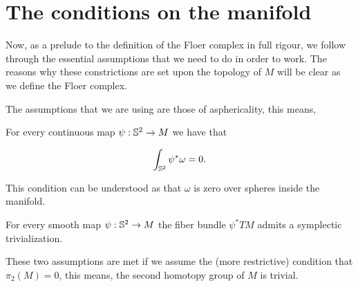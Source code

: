 \section{The conditions on the manifold}

Now, as a prelude to the definition of the Floer complex in full rigour, we follow through the essential assumptions that we need to do in order to work. The reasons why these constrictions are set upon the topology of $M$ will be clear as we define the Floer complex.

The assumptions that we are using are those of asphericality, this means,

\begin{assump} \label{assumption1}
For every continuous map $\psi : \mathbb{S}^2 \rightarrow M$ we have that

$$\int_{\mathbb{S}^2} \psi^{\ast} \omega = 0 .$$
\end{assump}

This condition can be understood as that $\omega$ is zero over spheres inside the manifold.

\begin{assump} \label{assumption2}
For every smooth map $\psi : \mathbb{S}^2 \rightarrow M$ the fiber bundle $\psi^{\ast} TM$ admits a symplectic trivialization.
\end{assump}

These two assumptions are met if we assume the (more restrictive) condition that $\pi_2(M) = 0$, this means, the second homotopy group of $M$ is trivial.

